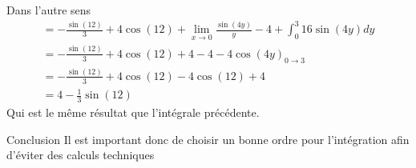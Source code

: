 \begin{parag}{Dans l'autre sens}
\begin{align*}
            = -\frac{\sin\left(12\right)}{3} + 4\cos\left(12\right) + \lim_{x \to 0} \frac{\sin\left(4y\right)}{y} - 4 + \int_0^3 16\sin\left(4y\right)dy\\
            = -\frac{\sin\left(12\right)}{3} + 4\cos\left(12\right) + 4 - 4 -4\cos\left(4y\right)_{0 \to 3}\\
            = -\frac{\sin\left(12\right)}{3} + 4\cos\left(12\right) - 4 \cos\left(12\right) + 4\\
            = 4- \frac{1}{3}\sin\left(12\right)
    \end{align*}
    Qui est le même résultat que l'intégrale précédente.
    
    \begin{subparag}{Conclusion}
        Il est important donc de choisir un bonne ordre pour l'intégration afin d'éviter des calculs techniques
    \end{subparag}
\end{parag}


